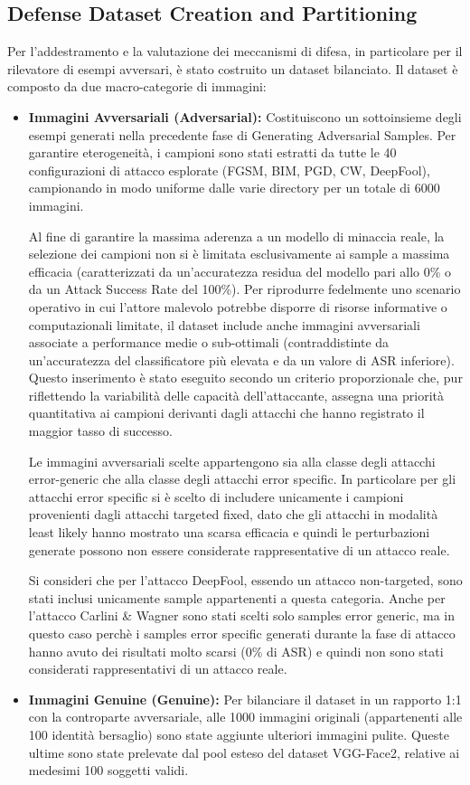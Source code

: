 \documentclass[a4paper, 12pt]{article}
\begin{document}
\subsection{Defense Dataset Creation and Partitioning}
Per l'addestramento e la valutazione dei meccanismi di difesa, 
in particolare per il rilevatore di esempi avversari, è stato costruito un dataset bilanciato. 
Il dataset è composto da due macro-categorie di immagini:
\begin{itemize}
    \item \textbf{Immagini Avversariali (Adversarial):} Costituiscono un sottoinsieme degli esempi generati nella precedente 
    fase di Generating Adversarial Samples. Per garantire eterogeneità, i campioni sono stati estratti da tutte 
    le 40 configurazioni di attacco esplorate (FGSM, BIM, PGD, CW, DeepFool), campionando in modo uniforme dalle varie 
    directory per un totale di 6000 immagini. 

    Al fine di garantire la massima aderenza a un modello di minaccia reale, la selezione dei 
    campioni non si è limitata esclusivamente ai sample a massima efficacia 
    (caratterizzati da un'accuratezza residua del modello pari allo 0\% o da un 
    Attack Success Rate del 100\%). Per riprodurre fedelmente uno scenario operativo 
    in cui l'attore malevolo potrebbe disporre di risorse informative o computazionali 
    limitate, il dataset include anche immagini avversariali associate a performance medie 
    o sub-ottimali (contraddistinte da un'accuratezza del classificatore più elevata e da un 
    valore di ASR inferiore). Questo inserimento è stato eseguito secondo un criterio 
    proporzionale che, pur riflettendo la variabilità delle capacità dell'attaccante, 
    assegna una priorità quantitativa ai campioni derivanti dagli attacchi che hanno 
    registrato il maggior tasso di successo.

    Le immagini avversariali scelte appartengono sia alla classe degli attacchi 
    error-generic che alla classe degli attacchi error specific. In particolare per gli attacchi error specific si è scelto
    di includere unicamente i campioni provenienti dagli attacchi targeted fixed, dato che gli attacchi in modalità least likely
    hanno mostrato una scarsa efficacia e quindi le perturbazioni generate possono non essere considerate rappresentative 
    di un attacco reale. 

    Si consideri che per l'attacco DeepFool, essendo un attacco non-targeted, sono stati inclusi unicamente sample appartenenti
    a questa categoria. Anche per l'attacco Carlini \& Wagner sono stati scelti solo samples error generic, ma in questo caso 
    perchè i samples error specific generati durante la fase di attacco hanno avuto dei risultati molto scarsi (0\% di ASR) e quindi non sono
    stati considerati rappresentativi di un attacco reale.
    \item \textbf{Immagini Genuine (Genuine):} Per bilanciare il dataset in un rapporto 1:1 con la controparte avversariale, 
    alle 1000 immagini originali (appartenenti alle 100 identità bersaglio) sono state aggiunte ulteriori 
    immagini pulite. Queste ultime sono state prelevate dal pool esteso del dataset VGG-Face2,
    relative ai medesimi 100 soggetti validi.
    

\end{itemize}
\end{document}
